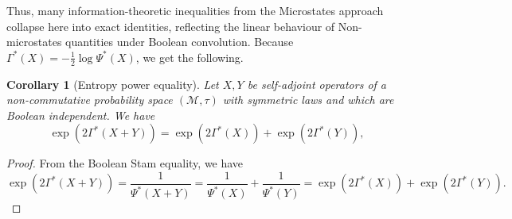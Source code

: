 \documentclass[10pt, reqno]{amsart}
\numberwithin{equation}{section}
\theoremstyle{definition}
\theoremstyle{plain}
\newtheorem{corollary}[definition]{Corollary}
\theoremstyle{remark}
\newcommand{\1}{\mathbbm{1}}
\begin{document}
Thus, many information-theoretic inequalities from the Microstates approach
collapse here into exact identities, reflecting the linear behaviour of
Non-microstates quantities under Boolean convolution. Because $\Gamma^*(X)=-\frac{1}{2}\log \Psi^*(X)$, we get the following.

    	\begin{corollary}[Entropy power equality]
	Let $X,Y$ be self-adjoint operators of a non-commutative probability space $(\mathcal{M},\tau)$ with symmetric laws and which are Boolean independent. We have
	\begin{equation}
	 	\exp(2\Gamma^*(X+Y))=  \exp(2\Gamma^*(X)) + \exp(2\Gamma^*(Y)),
	\end{equation}
	\end{corollary}
    \begin{proof}
From the Boolean Stam equality, we have
$$  \exp(2\Gamma^*(X+Y))=\frac{1}{\Psi^*(X+Y)}=\frac{1}{\Psi^*(X)}+\frac{1}{\Psi^*(Y)}=\exp(2\Gamma^*(X))+\exp(2\Gamma^*(Y)).
$$
    \end{proof}
\end{document}
